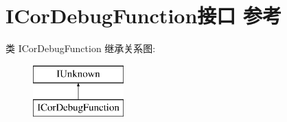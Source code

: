 \hypertarget{interface_i_cor_debug_function}{}\section{I\+Cor\+Debug\+Function接口 参考}
\label{interface_i_cor_debug_function}
类 I\+Cor\+Debug\+Function 继承关系图\+:\begin{figure}[H]
\begin{center}
\leavevmode
\includegraphics[height=2.000000cm]{interface_i_cor_debug_function}
\end{center}
\end{figure}
